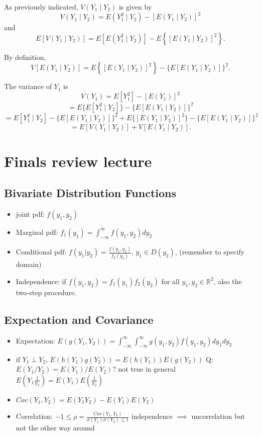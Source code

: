 \documentclass{report}
\begin{document}
\begin{myproof}
As previously indicated, \( V(Y_1 \mid Y_2) \) is given by
\[
V(Y_1 \mid Y_2) = E(Y_1^2 \mid Y_2) - [E(Y_1 \mid Y_2)]^2
\]
and
\[
E[V(Y_1 \mid Y_2)] = E[E(Y_1^2 \mid Y_2)] - E\left\{[E(Y_1 \mid Y_2)]^2\right\}.
\]

By definition,
\[
V[E(Y_1 \mid Y_2)] = E\left\{[E(Y_1 \mid Y_2)]^2\right\} - \{E[E(Y_1 \mid Y_2)]\}^2.
\]

The variance of \( Y_1 \) is
\[
V(Y_1) = E[Y_1^2] - [E(Y_1)]^2
\]
\[
= E\{E[Y_1^2 \mid Y_2]\} - \{E[E(Y_1 \mid Y_2)]\}^2
\]
\[
= E[Y_1^2 \mid Y_2] - \{E[E(Y_1 \mid Y_2)]\}^2 + E\{[E(Y_1 \mid Y_2)]^2\} - \{E[E(Y_1 \mid Y_2)]\}^2
\]
\[
= E[V(Y_1 \mid Y_2)] + V[E(Y_1 \mid Y_2)].
\]
\end{myproof}
\chapter{Finals review lecture}
\section{Bivariate Distribution Functions}
\begin{itemize}
	\item joint pdf: $f(y_1,y_2)$
	\item Marginal pdf: $f_1(y_1) = \int_{-\infty}^{\infty}f(y_1,y_2)dy_2$
	\item Conditional pdf: $f(y_1 | y_2) = \frac{f(y_1,y_2)}{f_2(y_2)}$, \quad $y_1 \in D(y_2)$, (remember to specify domain)
	\item Independence: if $f(y_1,y_2) = f_1(y_1)f_2(y_2)$ for all $y_1,y_2 \in \mathbb{R}^2$, also the two-step procedure.
\end{itemize}
\section{Expectation and Covariance}
\begin{itemize}
	\item Expectation: $E(g(Y_1,Y_2)) = \int_{-\infty}^{\infty}\int_{-\infty}^{\infty}g(y_1,y_2)f(y_1,y_2)dy_1dy_2$
	\item if $Y_1 \perp Y_2$, $E(h(Y_1)g(Y_2)) = E(h(Y_1))E(g(Y_2))$ 
	\subitem Q: $E(Y_1/Y_2) = E(Y_1)/E(Y_2)?$ \quad not true in general
	$E(Y_1\frac{1}{Y_2}) = E(Y_1)E(\frac{1}{Y_2})$
	\item $Cov(Y_1,Y_2) = E(Y_1Y_2) - E(Y_1)E(Y_2)$
	\item Correlation: $-1 \leq \rho = \frac{Cov(Y_1,Y_2)}{\sigma(Y_1)\sigma(Y_2) \leq 1}$
	\subitem independence $\implies$ uncorrelation but not the other way around
\end{itemize}
\end{document}
